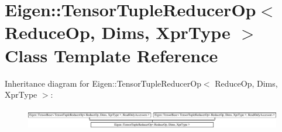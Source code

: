 \hypertarget{class_eigen_1_1_tensor_tuple_reducer_op}{}\section{Eigen\+:\+:Tensor\+Tuple\+Reducer\+Op$<$ Reduce\+Op, Dims, Xpr\+Type $>$ Class Template Reference}
\label{class_eigen_1_1_tensor_tuple_reducer_op}
Inheritance diagram for Eigen\+:\+:Tensor\+Tuple\+Reducer\+Op$<$ Reduce\+Op, Dims, Xpr\+Type $>$\+:\begin{figure}[H]
\begin{center}
\leavevmode
\includegraphics[height=0.954003cm]{class_eigen_1_1_tensor_tuple_reducer_op}
\end{center}
\end{figure}
